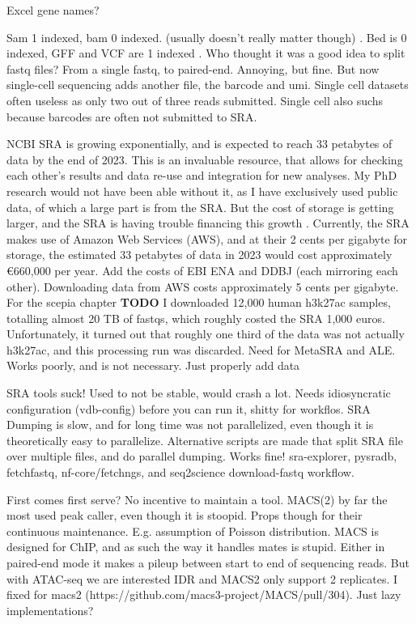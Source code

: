 Excel gene names?

Sam 1 indexed, bam 0 indexed. (usually doesn't really matter though) \cite{Li2009}. Bed is 0 indexed, GFF and VCF are 1 indexed \cite{Danecek2011}.
Who thought it was a good idea to split fastq files? From a single fastq, to paired-end. Annoying, but fine. But now single-cell sequencing adds another file, the barcode and umi. 
Single cell datasets often useless as only two out of three reads submitted.
Single cell also suchs because barcodes are often not submitted to SRA.

NCBI SRA is growing exponentially\cite{srawebsite,Katz2021}, and is expected to reach 33 petabytes of data by the end of 2023. This is an invaluable resource, that allows for checking each other's results and data re-use and integration for new analyses. My PhD research would not have been able without it, as I have exclusively used public data, of which a large part is from the SRA. But the cost of storage is getting larger, and the SRA is having trouble financing this growth \cite{srawebsite2}. Currently, the SRA makes use of Amazon Web Services (AWS), and at their 2 cents per gigabyte for storage, the estimated 33 petabytes of data in 2023 would cost approximately €660,000 per year. Add the costs of EBI ENA and DDBJ (each mirroring each other). Downloading data from AWS costs approximately 5 cents per gigabyte. For the scepia chapter \textbf{TODO} I downloaded 12,000 human h3k27ac samples, totalling almost 20 TB of fastqs, which roughly costed the SRA 1,000 euros. Unfortunately, it turned out that roughly one third of the data was not actually h3k27ac, and this processing run was discarded. Need for MetaSRA and ALE. Works poorly, and is not necessary. Just properly add data

SRA tools suck! Used to not be stable, would crash a lot. Needs idiosyncratic configuration (vdb-config) before you can run it, shitty for workflos. SRA Dumping is slow, and for long time was not parallelized, even though it is theoretically easy to parallelize. Alternative scripts are made that split SRA file over multiple files, and do parallel dumping. Works fine! sra-explorer, pysradb, fetchfastq, nf-core/fetchngs, and seq2science download-fastq workflow.

First comes first serve? No incentive to maintain a tool. MACS(2) by far the most used peak caller, even though it is stoopid. Props though for their continuous maintenance. E.g. assumption of Poisson distribution. MACS is designed for ChIP, and as such the way it handles mates is stupid. Either in paired-end mode it makes a pileup between start to end of sequencing reads. But with ATAC-seq we are interested 
IDR and MACS2 only support 2 replicates. I fixed for macs2 (https://github.com/macs3-project/MACS/pull/304). Just lazy implementations?

